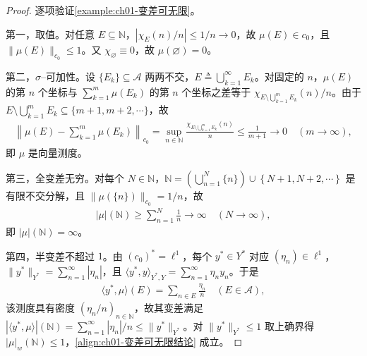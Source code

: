 \documentclass[../../main.tex]{subfiles}%
\begin{document}
\begin{proof}
逐项验证\cref{example:ch01-变差可无限}。

第一，取值。对任意 $E\subseteq\mathbb{N}$，$\left|\chi_E(n)/n\right|\leqslant1/n\to0$，故 $\mu(E)\in c_0$，且 $\|\mu(E)\|_{c_0}\leqslant1$。又 $\chi_{\varnothing}\equiv0$，故 $\mu(\varnothing)=0$。

第二，$\sigma$--可加性。设 $\{E_k\}\subseteq\mathcal{A}$ 两两不交，$E\triangleq\bigcup_{k=1}^\infty E_k$。对固定的 $n$，$\mu(E)$ 的第 $n$ 个坐标与 $\sum_{k=1}^m\mu(E_k)$ 的第 $n$ 个坐标之差等于 $\chi_{E\setminus\bigcup_{k=1}^mE_k}(n)/n$。由于 $E\setminus\bigcup_{k=1}^mE_k\subseteq\{m+1,m+2,\cdots\}$，故
\begin{align*}
\left\|\mu(E)-\sum_{k=1}^m\mu(E_k)\right\|_{c_0}
=\sup_{n\in\mathbb{N}}\frac{\chi_{E\setminus\bigcup_{k=1}^mE_k}(n)}{n}
\leqslant\frac{1}{m+1}\longrightarrow0\quad(m\to\infty),
\end{align*}
即 $\mu$ 是向量测度。

第三，全变差无穷。对每个 $N\in\mathbb{N}$，$\mathbb{N}=\left(\bigcup_{n=1}^N\{n\}\right)\cup\left\{N+1,N+2,\cdots\right\}$ 是有限不交分解，且 $\|\mu(\{n\})\|_{c_0}=1/n$，故
\begin{align*}
|\mu|(\mathbb{N})\geqslant\sum_{n=1}^N\frac1n\longrightarrow\infty\quad(N\to\infty),
\end{align*}
即 $|\mu|(\mathbb{N})=\infty$。

第四，半变差不超过 $1$。由 $(c_0)^*=\ell^1$，每个 $y^*\in Y^*$ 对应 $(\eta_n)\in\ell^1$，$\|y^*\|_{Y^*}=\sum_{n=1}^\infty|\eta_n|$，且 $\langle y^*,y\rangle_{Y^*,Y}=\sum_{n=1}^\infty\eta_ny_n$。于是
\begin{align*}
\langle y^*,\mu\rangle(E)=\sum_{n\in E}\frac{\eta_n}{n}\quad(E\in\mathcal{A}),
\end{align*}
该测度具有密度 $(\eta_n/n)_{n\in\mathbb{N}}$，故其变差满足 $\left|\langle y^*,\mu\rangle\right|(\mathbb{N})=\sum_{n=1}^\infty|\eta_n|/n\leqslant\|y^*\|_{Y^*}$。对 $\|y^*\|_{Y^*}\leqslant1$ 取上确界得 $|\mu|_w(\mathbb{N})\leqslant1$，\eqref{align:ch01-变差可无限结论} 成立。
\end{proof}
\end{document}
